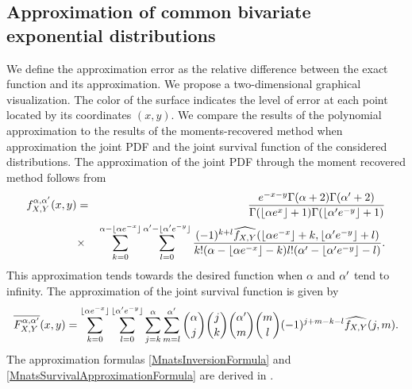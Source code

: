 \subsection{Approximation of common bivariate exponential distributions}
We define the approximation error as the relative difference between the exact function and its approximation. We propose a two-dimensional graphical visualization. The color of the surface indicates the level of error at each point located by its coordinates $(x,y)$. We compare the results of the polynomial approximation to the results of the moments-recovered method when approximation the joint PDF and the joint survival function of the considered distributions. The approximation of the joint PDF through the moment recovered method follows from
\begin{eqnarray}\label{MnatsInversionFormula}
f^{\alpha,\alpha\rq{}}_{X,Y}(x,y)&=&\frac{e^{-x-y}\Gamma(\alpha+2)\Gamma(\alpha\rq{}+2)}{\Gamma(\lfloor\alpha e^{x}\rfloor+1)\Gamma(\lfloor\alpha\rq{} e^{-y}\rfloor+1)}\nonumber\\
&\times&\sum_{k=0}^{\alpha-\lfloor\alpha e^{-x}\rfloor}\sum_{l=0}^{\alpha\rq{}-\lfloor\alpha\rq{} e^{-y}\rfloor}\frac{(-1)^{k+l}\widehat{f_{X,Y}}(\lfloor\alpha e^{-x}\rfloor+k,\lfloor\alpha\rq{} e^{-y}\rfloor+l)}{k!(\alpha-\lfloor\alpha e^{-x}\rfloor-k)l!(\alpha\rq{}-\lfloor\alpha\rq{} e^{-y}\rfloor-l)}.\label{MnatsInversionFormula}
\end{eqnarray}
This approximation tends towards the desired function when $\alpha$ and $\alpha\rq{}$ tend to infinity.  The approximation of the joint survival function is given by
\begin{equation}\label{MnatsSurvivalApproximationFormula}
\overline{F_{X,Y}^{\alpha,\alpha\rq{}}}(x,y)=\sum_{k=0}^{\lfloor\alpha e^{-x}\rfloor}\sum_{l=0}^{\lfloor\alpha\rq{} e^{-y}\rfloor}\sum_{j=k}^{\alpha}\sum_{m=l}^{\alpha\rq{}}\binom{\alpha}{j}\binom{j}{k}\binom{\alpha\rq{}}{m}\binom{m}{l}(-1)^{j+m-k-l}\widehat{f_{X,Y}}(j,m).
\end{equation}
The approximation formulas \eqref{MnatsInversionFormula} and \eqref{MnatsSurvivalApproximationFormula} are derived in \citet{Mn11}.
